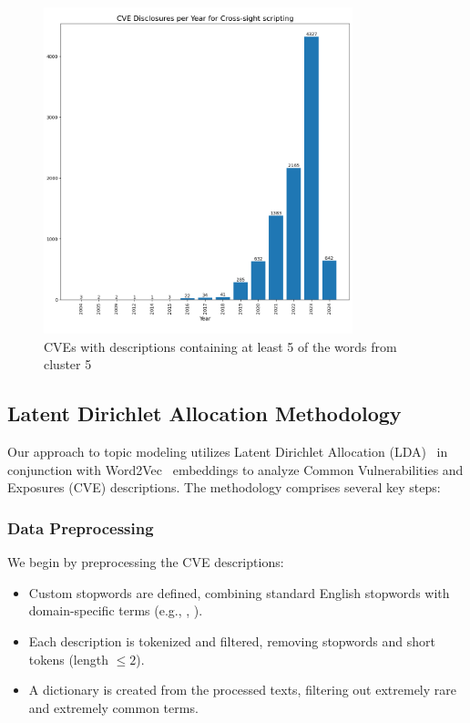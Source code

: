 \documentclass[12pt]{article}
\begin{document}
\begin{figure}[H]
	\centering

	\includegraphics[width=0.8\textwidth]{figures/cross_site_per_year.png}
	\caption{\label{fig:cross_site_per_year}CVEs with descriptions containing at least 5 of the
		words from cluster 5}
\end{figure}




\subsection{Latent Dirichlet Allocation Methodology}

Our approach to topic modeling utilizes Latent Dirichlet Allocation (LDA)~\cite{lda_origin} in conjunction with
Word2Vec~\cite{word2vec} embeddings to analyze Common Vulnerabilities and Exposures (CVE) descriptions. The
methodology comprises several key steps:

\subsubsection{Data Preprocessing} We begin by preprocessing the CVE descriptions:

\begin{itemize}

	\item Custom stopwords are defined, combining standard English stopwords with domain-specific
	      terms (e.g., , ).

	\item Each description is tokenized and filtered, removing stopwords and short tokens (length
	      $\leq 2$).

	\item A dictionary is created from the processed texts, filtering out extremely rare and
	      extremely common terms.

\end{itemize}
\end{document}
